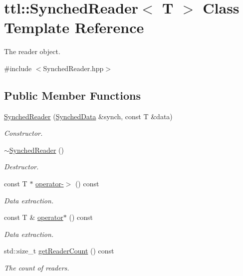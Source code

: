 \hypertarget{classttl_1_1_synched_reader}{\section{ttl\-:\-:Synched\-Reader$<$ T $>$ Class Template Reference}
\label{classttl_1_1_synched_reader}
}


The reader object.  




{\ttfamily \#include $<$Synched\-Reader.\-hpp$>$}

\subsection*{Public Member Functions}
\begin{DoxyCompactItemize}
\item 
\hyperlink{classttl_1_1_synched_reader_a372c3edad0bb203d4020db4cf37dfd5a}{Synched\-Reader} (\hyperlink{structttl_1_1_synched_data}{Synched\-Data} \&synch, const T \&data)
\begin{DoxyCompactList}\small\item\em Constructor. \end{DoxyCompactList}\item 
\hyperlink{classttl_1_1_synched_reader_a1074be7ecda55d0ed6b729781773d160}{$\sim$\-Synched\-Reader} ()
\begin{DoxyCompactList}\small\item\em Destructor. \end{DoxyCompactList}\item 
const T $\ast$ \hyperlink{classttl_1_1_synched_reader_a49fe60c81e1a0311eb9a5a1ae2c778e8}{operator-\/$>$} () const 
\begin{DoxyCompactList}\small\item\em Data extraction. \end{DoxyCompactList}\item 
const T \& \hyperlink{classttl_1_1_synched_reader_a1a36614df1ac988950c548af532047bb}{operator$\ast$} () const 
\begin{DoxyCompactList}\small\item\em Data extraction. \end{DoxyCompactList}\item 
std\-::size\-\_\-t \hyperlink{classttl_1_1_synched_reader_a5bf67d186e49a9dc45f93379b6cf474c}{get\-Reader\-Count} () const 
\begin{DoxyCompactList}\small\item\em The count of readers. \end{DoxyCompactList}\end{DoxyCompactItemize}


